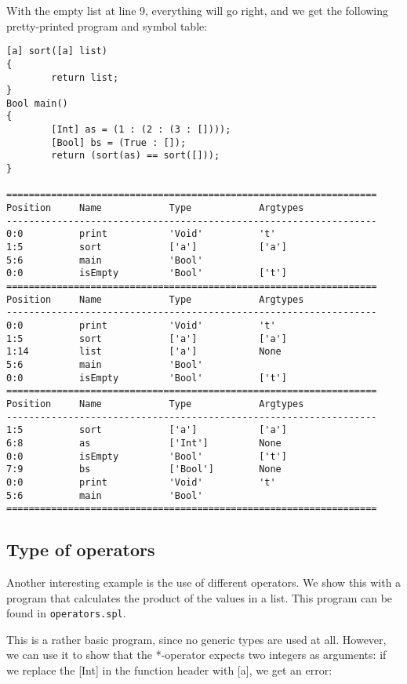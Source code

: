\documentclass[a4paper]{article}
\begin{document}
With the empty list at line 9, everything will go right, and we get the following pretty-printed program and symbol table: 

\begin{verbatim}
[a] sort([a] list)
{
        return list;
}
Bool main()
{
        [Int] as = (1 : (2 : (3 : [])));
        [Bool] bs = (True : []);
        return (sort(as) == sort([]));
}

==================================================================
Position     Name            Type            Argtypes            
------------------------------------------------------------------
0:0          print           'Void'          't'                 
1:5          sort            ['a']           ['a']               
5:6          main            'Bool'                              
0:0          isEmpty         'Bool'          ['t']               
==================================================================
Position     Name            Type            Argtypes            
------------------------------------------------------------------
0:0          print           'Void'          't'                 
1:5          sort            ['a']           ['a']               
1:14         list            ['a']           None                
5:6          main            'Bool'                              
0:0          isEmpty         'Bool'          ['t']               
==================================================================
Position     Name            Type            Argtypes            
------------------------------------------------------------------
1:5          sort            ['a']           ['a']               
6:8          as              ['Int']         None                
0:0          isEmpty         'Bool'          ['t']               
7:9          bs              ['Bool']        None                
0:0          print           'Void'          't'                 
5:6          main            'Bool'                              
==================================================================
\end{verbatim}

\subsection{Type of operators}

Another interesting example is the use of different operators. We show this with a program that calculates the product of the values in a list. This program can be found in {\tt operators.spl}.

This is a rather basic program, since no generic types are used at all. However, we can use it to show that the *-operator expects two integers as arguments: if we replace the [Int] in the function header with [a], we get an error: 
\end{document}
